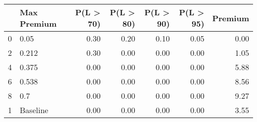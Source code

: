 \begin{tabular}{llrrrrr}
\toprule
{} & Max Premium &  P(L > 70) &  P(L > 80) &  P(L > 90) &  P(L > 95) &  Premium \\
\midrule
0 &        0.05 &       0.30 &       0.20 &       0.10 &       0.05 &     0.00 \\
2 &       0.212 &       0.30 &       0.00 &       0.00 &       0.00 &     1.05 \\
4 &       0.375 &       0.00 &       0.00 &       0.00 &       0.00 &     5.88 \\
6 &       0.538 &       0.00 &       0.00 &       0.00 &       0.00 &     8.56 \\
8 &         0.7 &       0.00 &       0.00 &       0.00 &       0.00 &     9.27 \\
1 &    Baseline &       0.00 &       0.00 &       0.00 &       0.00 &     3.55 \\
\bottomrule
\end{tabular}
